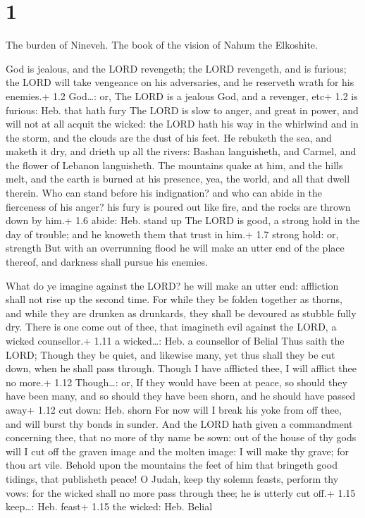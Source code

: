 \hypertarget{section}{%
\section{1}\label{section}}

 The burden of Nineveh. The book of the vision of Nahum the
Elkoshite.

 God is jealous, and the LORD revengeth; the LORD revengeth,
and is furious; the LORD will take vengeance on his adversaries, and he
reserveth wrath for his enemies.+ 1.2 God\ldots: or, The LORD is a
jealous God, and a revenger, etc+ 1.2 is furious: Heb. that hath fury
 The LORD is slow to anger, and great in power, and will not
at all acquit the wicked: the LORD hath his way in the whirlwind and in
the storm, and the clouds are the dust of his feet.  He
rebuketh the sea, and maketh it dry, and drieth up all the rivers:
Bashan languisheth, and Carmel, and the flower of Lebanon languisheth.
 The mountains quake at him, and the hills melt, and the
earth is burned at his presence, yea, the world, and all that dwell
therein.  Who can stand before his indignation? and who can
abide in the fierceness of his anger? his fury is poured out like fire,
and the rocks are thrown down by him.+ 1.6 abide: Heb. stand up
 The LORD is good, a strong hold in the day of trouble; and
he knoweth them that trust in him.+ 1.7 strong hold: or, strength
 But with an overrunning flood he will make an utter end of
the place thereof, and darkness shall pursue his enemies.

 What do ye imagine against the LORD? he will make an utter
end: affliction shall not rise up the second time.  For
while they be folden together as thorns, and while they are drunken as
drunkards, they shall be devoured as stubble fully dry. 
There is one come out of thee, that imagineth evil against the LORD, a
wicked counsellor.+ 1.11 a wicked\ldots: Heb. a counsellor of Belial
 Thus saith the LORD; Though they be quiet, and likewise
many, yet thus shall they be cut down, when he shall pass through.
Though I have afflicted thee, I will afflict thee no more.+ 1.12
Though\ldots: or, If they would have been at peace, so should they have
been many, and so should they have been shorn, and he should have passed
away+ 1.12 cut down: Heb. shorn  For now will I break his
yoke from off thee, and will burst thy bonds in sunder. 
And the LORD hath given a commandment concerning thee, that no more of
thy name be sown: out of the house of thy gods will I cut off the graven
image and the molten image: I will make thy grave; for thou art vile.
 Behold upon the mountains the feet of him that bringeth
good tidings, that publisheth peace! O Judah, keep thy solemn feasts,
perform thy vows: for the wicked shall no more pass through thee; he is
utterly cut off.+ 1.15 keep\ldots: Heb. feast+ 1.15 the wicked: Heb.
Belial

